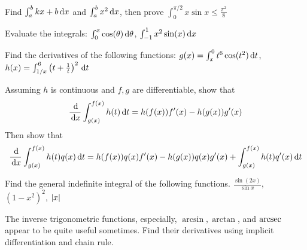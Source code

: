 \documentclass[Calculus 1 Recitation.tex]{subfiles}
\begin{document}
\begin{myleftlinebox}
	Find $\int_a^b kx+b\,\mathrm{d} x$ and $\int_a^b x^2\,\mathrm{d} x$, then prove $\int_0^{\pi/2} x\sin x\leq \frac{\pi^2}{8}$
	\tcblower
	\vspace{2em}
\end{myleftlinebox}

\begin{myleftlinebox}
	Evaluate the integrals: $\int_{0}^{x}\cos(\theta)\,\mathrm{d} \theta$, $\int_{-1}^1 x^2\sin(x) \,\mathrm{d} x$
	\tcblower
	\vspace{2em}
\end{myleftlinebox}

\begin{myleftlinebox}
	Find the derivatives of the following functions: $g(x)=\int_x^0 t^6\cos(t^2)\,\mathrm{d} t$, $h(x)=\int_{1/x}^6 \left( t+\frac{1}{t} \right)^2\,\mathrm{d} t$
	\tcblower
	\vspace{2em}
\end{myleftlinebox}

\begin{myleftlinebox}
	Assuming $h$ is continuous and $f,g$ are differentiable, show that
	\[\frac{\,\mathrm{d}}{\,\mathrm{d} x} \int_{g(x)}^{f(x)} h(t)\,\mathrm{d} t = h(f(x))f'(x)-h(g(x))g'(x)\]
	Then show that
	\[\frac{\,\mathrm{d}}{\,\mathrm{d} x} \int_{g(x)}^{f(x)} h(t)q(x)\,\mathrm{d} t = h(f(x))q(x)f'(x)-h(g(x))q(x)g'(x)+\int_{g(x)}^{f(x)} h(t)q'(x)\,\mathrm{d} t\]
	\tcblower
	\vspace{2em}
\end{myleftlinebox}

\begin{myleftlinebox}
	Find the general indefinite integral of the following functions. $\frac{\sin(2x)}{\sin x}$, $(1-x^2)^2$, $\left\vert x\right\vert$
	\tcblower
	\vspace{2em}
\end{myleftlinebox}

\begin{myleftlinebox}
	The inverse trigonometric functions, especially, $\arcsin, \arctan$, and $\operatorname{arcsec}$ appear to be quite useful sometimes. Find their derivatives using implicit differentiation and chain rule.
	\tcblower
	\vspace{2em}
\end{myleftlinebox}
\end{document}
